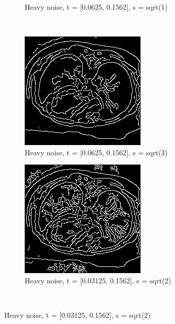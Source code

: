 \begin{figure}[H]
\begin{subfigure}{.5\textwidth}
    \caption{Heavy noise, t = [0.0625, 0.1562], s = sqrt(1)}
    \label{fig:h_noise_insens_l_thres}
  \end{subfigure}\\%
    \begin{subfigure}{.5\textwidth}
    \centering
    \includegraphics[width=.9\textwidth]{./edgedetection/canny_heavy_noise/h_noise_h_sigma_sqr3}
    \caption{Heavy noise, t = [0.0625, 0.1562], s = sqrt(3)}
    \label{fig:h_noise_h_sigma_sqr3}
  \end{subfigure}%
  \begin{subfigure}{.5\textwidth}
    \centering
    \includegraphics[width=.9\textwidth]{./edgedetection/canny_heavy_noise/h_noise_sens_l_thres}
    \caption{Heavy noise, t = [0.03125, 0.1562], s = sqrt(2)}
    \label{fig:h_noise_sens_l_thres}
  \end{subfigure}\\%
\end{figure}

